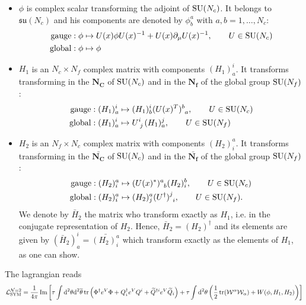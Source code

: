     \begin{itemize}
        \item $\phi$ is complex scalar transforming the adjoint of $\text{SU}(N_c)$. It belongs to $\mathfrak{su}(N_c)$ and his components are denoted by $\phi^a_b$ with $a,b=1,\dots,N_c$:
        \begin{align}
            \text{gauge} &: \phi \mapsto U(x)\phi U(x)^{-1}+U(x)\partial_\mu U(x)^{-1},\qquad U\in\text{SU}(N_c)\\
            \text{global} &: \phi\mapsto \phi
        \end{align}
        \item $H_1$ is an $N_c\times N_f$ complex matrix with components $(H_1)^i_a$. It transforms transforming in the $\boldsymbol{N_C}$ of $\text{SU}(N_c)$ and in the $\boldsymbol{N_f}$ of the global group $\text{SU}(N_f)$:
        \begin{align}
            \text{gauge} &: (H_1)^i_a \mapsto (H_1)^i_b(U(x)^T)\indices{^b_a},\qquad U\in\SU(N_c)\\
            \text{global} &: (H_1)^i_a \mapsto  U\indices{^i_j}(H_1)^j_a,\qquad U\in\SU(N_f)
        \end{align}
        \item $H_2$ is an $N_f\times N_c$ complex matrix with components $(H_2)^a_i$. It transforms transforming in the $\bar{\boldsymbol{N_C}}$ of $\text{SU}(N_c)$ and in the $\bar{\boldsymbol{N_f}}$ of the global group $\text{SU}(N_f)$:
        \begin{align}
            \text{gauge} &: (H_2)^a_i \mapsto (U(x)^*)\indices{^a_b} (H_2)^b_i,\qquad U\in\SU(N_c)\\
            \text{global} &: (H_2)^a_i \mapsto  (H_2)^a_j(U^\dagger)\indices{^j_i},\qquad U\in\SU(N_f).
        \end{align}
        We denote by $\bar{H}_2$ the matrix who transform exactly as $H_1$, i.e. in the conjugate representation of $H_2$. Hence, $\bar{H}_2=(H_2)^\dagger$ and its elements are given by $(\bar{H}_2)^i_a=\bar{(H_2)^a_i}$ which transform exactly as the elements of $H_1$, as one can show.
    \end{itemize}
    The lagrangian reads
    \begin{equation}
        \mathcal{L}^{\mathcal{N}=2}_{\text{SYM}} = \frac{1}{4\pi}\Im\left[\tau\int\text{d}^2\theta\text{d}^2\overline{\theta}\tr\left(\Phi^\dagger e^V\Phi + Q^\dagger_i e^V Q^i + \widetilde{Q}^{\dagger i}e^V \widetilde{Q}_i\right)+\tau\int\text{d}^2\theta\left(\frac{1}{2}\tr(\mathcal{W}^\alpha\mathcal{W}_\alpha)+W(\phi,H_1,H_2)\right)\right]\label{eq:lag}
    \end{equation}
